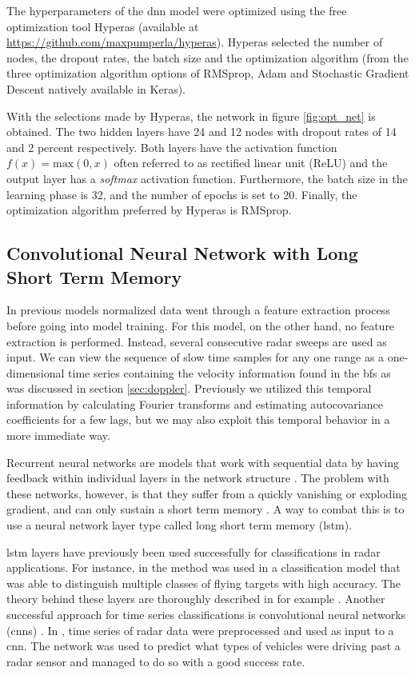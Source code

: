 The hyperparameters of the \gls{dnn} model were optimized using the free optimization tool Hyperas (available at \url{https://github.com/maxpumperla/hyperas}). Hyperas selected the number of nodes, the dropout rates, the batch size and the optimization algorithm (from the three optimization algorithm options of RMSprop, Adam and Stochastic Gradient Descent natively available in Keras). 

With the selections made by Hyperas, the network in figure \ref{fig:opt_net} is obtained. The two hidden layers have 24 and 12 nodes with dropout rates of 14 and 2 percent respectively. Both layers have the activation function $f(x)=\textrm{max}(0,x)$ often referred to as rectified linear unit (ReLU) and the output layer has a \textit{softmax} activation function. Furthermore, the batch size in the learning phase is 32, and the number of epochs is set to 20. Finally, the optimization algorithm preferred by Hyperas is RMSprop.

\subsection{Convolutional Neural Network with Long Short Term Memory}

In previous models normalized data went through a feature extraction process before going into model training. For this model, on the other hand, no feature extraction is performed. Instead, several consecutive radar sweeps are used as input. We can view the sequence of slow time samples for any one range as a one-dimensional time series containing the velocity information found in the \gls{bf}s as was discussed in section \ref{sec:doppler}. Previously we utilized this temporal information by calculating Fourier transforms and estimating autocovariance coefficients for a few lags, but we may also exploit this temporal behavior in a more immediate way.

Recurrent neural networks are models that work with sequential data by having feedback within individual layers in the network structure \citep{karim_majumdar_darabi_chen_2018}. The problem with these networks, however, is that they suffer from a quickly vanishing or exploding gradient, and can only sustain a short term memory \citep{pascanu_mikolov_bengio_2013}. A way to combat this is to use a neural network layer type called long short term memory (\gls{lstm}).

\gls{lstm} layers have previously been used successfully for classifications in radar applications. For instance, in \citep{jithesh_sagayaraj_srinivasa_2017} the method was used in a classification model that was able to distinguish multiple classes of flying targets with high accuracy. The theory behind these layers are thoroughly described in for example \citep{hochreiter_schmidhuber_1997}. Another successful approach for time series classifications is convolutional neural networks (\gls{cnn}s) \citep{karim_majumdar_darabi_chen_2018}. In \citep{capobianco_facheris_cuccoli_marinai_2018}, time series of radar data were preprocessed and used as input to a \gls{cnn}. The network was used to predict what types of vehicles were driving past a radar sensor and managed to do so with a good success rate.

